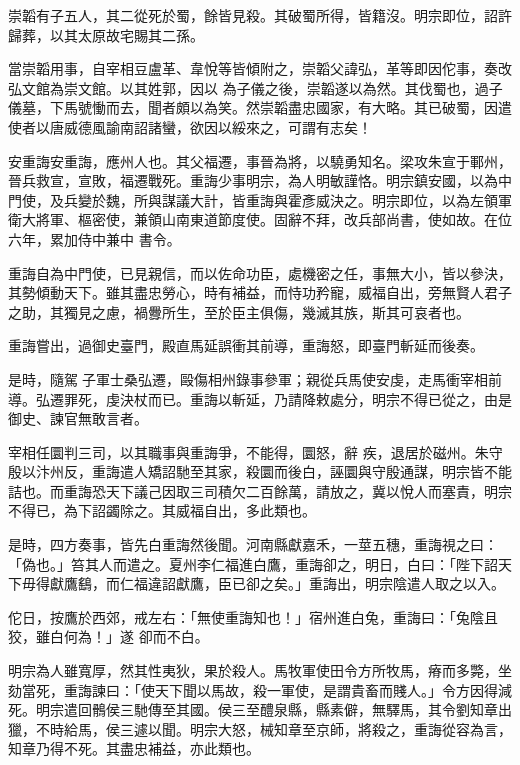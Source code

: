 \begin{pinyinscope}
 崇韜有子五人，其二從死於蜀，餘皆見殺。其破蜀所得，皆籍沒。明宗即位，詔許歸葬，以其太原故宅賜其二孫。



 當崇韜用事，自宰相豆盧革、韋悅等皆傾附之，崇韜父諱弘，革等即因佗事，奏改弘文館為崇文館。以其姓郭，因以
 為子儀之後，崇韜遂以為然。其伐蜀也，過子儀墓，下馬號慟而去，聞者頗以為笑。然崇韜盡忠國家，有大略。其已破蜀，因遣使者以唐威德風諭南詔諸蠻，欲因以綏來之，可謂有志矣！



 安重誨安重誨，應州人也。其父福遷，事晉為將，以驍勇知名。梁攻朱宣于鄆州，晉兵救宣，宣敗，福遷戰死。重誨少事明宗，為人明敏謹恪。明宗鎮安國，以為中門使，及兵變於魏，所與謀議大計，皆重誨與霍彥威決之。明宗即位，以為左領軍衛大將軍、樞密使，兼領山南東道節度使。固辭不拜，改兵部尚書，使如故。在位六年，累加侍中兼中
 書令。



 重誨自為中門使，已見親信，而以佐命功臣，處機密之任，事無大小，皆以參決，其勢傾動天下。雖其盡忠勞心，時有補益，而恃功矜寵，威福自出，旁無賢人君子之助，其獨見之慮，禍釁所生，至於臣主俱傷，幾滅其族，斯其可哀者也。



 重誨嘗出，過御史臺門，殿直馬延誤衝其前導，重誨怒，即臺門斬延而後奏。



 是時，隨駕子軍士桑弘遷，毆傷相州錄事參軍；親從兵馬使安虔，走馬衝宰相前導。弘遷罪死，虔決杖而已。重誨以斬延，乃請降敕處分，明宗不得已從之，由是御史、諫官無敢言者。



 宰相任圜判三司，以其職事與重誨爭，不能得，圜怒，辭
 疾，退居於磁州。朱守殷以汴州反，重誨遣人矯詔馳至其家，殺圜而後白，誣圜與守殷通謀，明宗皆不能詰也。而重誨恐天下議己因取三司積欠二百餘萬，請放之，冀以悅人而塞責，明宗不得已，為下詔蠲除之。其威福自出，多此類也。



 是時，四方奏事，皆先白重誨然後聞。河南縣獻嘉禾，一莖五穗，重誨視之曰：「偽也。」笞其人而遣之。夏州李仁福進白鷹，重誨卻之，明日，白曰：「陛下詔天下毋得獻鷹鷂，而仁福違詔獻鷹，臣已卻之矣。」重誨出，明宗陰遣人取之以入。



 佗日，按鷹於西郊，戒左右：「無使重誨知也！」宿州進白兔，重誨曰：「兔陰且狡，雖白何為！」遂
 卻而不白。



 明宗為人雖寬厚，然其性夷狄，果於殺人。馬牧軍使田令方所牧馬，瘠而多斃，坐劾當死，重誨諫曰：「使天下聞以馬故，殺一軍使，是謂貴畜而賤人。」令方因得減死。明宗遣回鶻侯三馳傳至其國。侯三至醴泉縣，縣素僻，無驛馬，其令劉知章出獵，不時給馬，侯三遽以聞。明宗大怒，械知章至京師，將殺之，重誨從容為言，知章乃得不死。其盡忠補益，亦此類也。




\end{pinyinscope}

